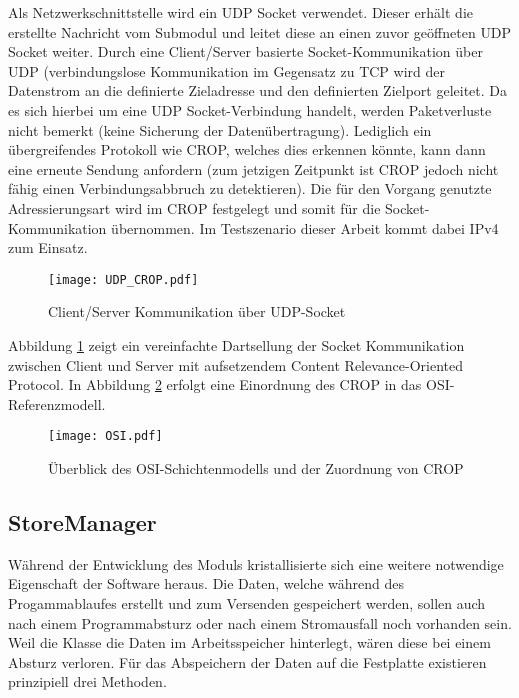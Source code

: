 Als Netzwerkschnittstelle wird ein \gls{UDP} Socket verwendet. Dieser erh{\"a}lt die
erstellte Nachricht vom Submodul  und leitet diese an einen
zuvor ge{\"o}ffneten \gls{UDP} Socket weiter. Durch eine Client/Server basierte
Socket-Kommunikation {\"u}ber \gls{UDP} (verbindungslose Kommunikation im Gegensatz
zu \gls{TCP} wird der Datenstrom an die definierte Zieladresse und den
definierten Zielport geleitet. Da es sich hierbei um eine \gls{UDP} Socket-Verbindung handelt,
werden Paketverluste nicht bemerkt (keine Sicherung der Daten{\"u}bertragung).
Lediglich ein {\"u}bergreifendes Protokoll wie \gls{CROP}, welches dies erkennen
k{\"o}nnte, kann dann eine erneute Sendung anfordern (zum jetzigen Zeitpunkt
ist \gls{CROP} jedoch nicht f{\"a}hig einen Verbindungsabbruch zu detektieren). Die
f{\"u}r den Vorgang genutzte Adressierungsart wird im \gls{CROP} festgelegt
und somit f{\"u}r die Socket-Kommunikation {\"u}bernommen. Im Testszenario
dieser Arbeit kommt dabei IPv4 zum Einsatz.

\begin{figure}[H]
\centering
\texttt{[image: UDP\_CROP.pdf]}
\caption{Client/Server Kommunikation {\"u}ber UDP-Socket}
\label{fig:Socket-Kommunikation}
\end{figure}

Abbildung \ref{fig:Socket-Kommunikation} zeigt ein vereinfachte Dartsellung der
Socket Kommunikation zwischen Client und Server mit aufsetzendem Content
Relevance-Oriented Protocol. In Abbildung \ref{fig:OSI} erfolgt eine Einordnung
des \gls{CROP} in das OSI-Referenzmodell.

\begin{figure}[H]
\centering
\texttt{[image: OSI.pdf]}
\caption{{\"U}berblick des OSI-Schichtenmodells und der Zuordnung von CROP}
\label{fig:OSI}
\end{figure}



\subsection{StoreManager}

W{\"a}hrend der Entwicklung des Moduls  kristallisierte sich eine
weitere notwendige Eigenschaft der Software heraus.
Die Daten, welche w{\"a}hrend des Progammablaufes erstellt und zum Versenden
gespeichert werden, sollen auch nach einem Programmabsturz oder nach einem
Stromausfall noch vorhanden sein. Weil die Klasse 
die Daten im Arbeitsspeicher hinterlegt, w{\"a}ren diese bei einem Absturz
verloren.
F{\"u}r das Abspeichern der Daten auf die Festplatte existieren prinzipiell drei Methoden.

